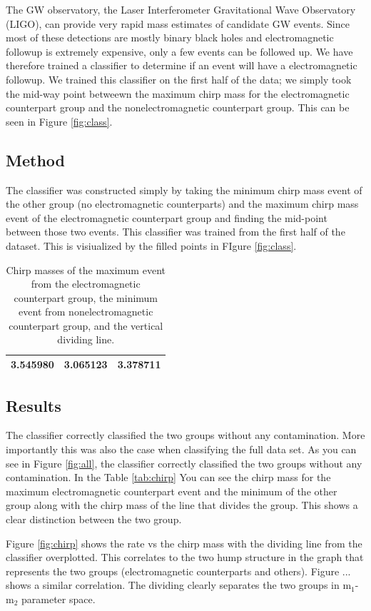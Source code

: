 The GW observatory, the Laser Interferometer Gravitational Wave Observatory (LIGO), can provide very rapid mass estimates of candidate GW events. Since most of these detections are mostly binary black holes and electromagnetic followup is extremely expensive, only a few events can be followed up. We have therefore trained a classifier to determine if an event will have a electromagnetic followup. We trained this classifier on the first half of the data; we simply took the mid-way point betweewn the maximum chirp mass for the electromagnetic counterpart group and the nonelectromagnetic counterpart group. This can be seen in Figure \ref{fig:class}.


\subsection{Method}
The classifier was constructed simply by taking the minimum chirp mass event of the other group (no electromagnetic counterparts) and the maximum chirp mass event of the electromagnetic counterpart group and finding the mid-point between those two events. This classifier was trained from the first half of the dataset. This is visiualized by the filled points in FIgure \ref{fig:class}.

\begin{table}[ht]
\caption{Chirp masses of the maximum event from the electromagnetic counterpart group, the minimum event from nonelectromagnetic counterpart group, and the vertical dividing line.}
\centering
\begin{tabular}{c c c}

\hline\hline
3.545980 & 3.065123 & 3.378711\\
\hline\hline
\end{tabular}
\label{tab:mass}
\end{table}

\subsection{Results}
The classifier correctly classified the two groups without any contamination. More importantly this was also the case when classifying the full data set. As you can see in Figure \ref{fig:all}, the classifier correctly classified the two groups without any contamination. In the Table \ref{tab:chirp} You can see the chirp mass for the maximum electromagnetic counterpart event and the minimum of the other group along with the chirp mass of the line that divides the group. This shows a clear distinction between the two group.



Figure \ref{fig:chirp} shows the rate vs the chirp mass with the dividing line from the classifier overplotted. This correlates to the two hump structure in the graph that represents the two groups (electromagnetic counterparts and others). Figure ... shows a similar correlation. The dividing clearly separates the two groups in  m$_{1}$-m$_{2}$ parameter space.
